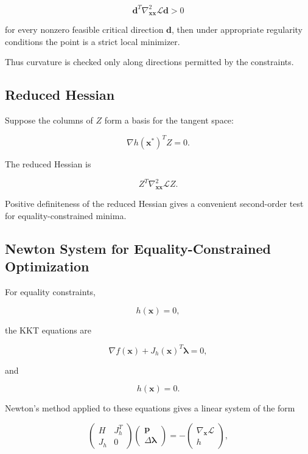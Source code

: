 \[
\boxed{
\mathbf{d}^T
\nabla_{\mathbf{x}\mathbf{x}}^2
\mathcal{L}
\mathbf{d}
>0
}
\]

for every nonzero feasible critical direction \(\mathbf{d}\), then under
appropriate regularity conditions the point is a strict local minimizer.

Thus curvature is checked only along directions permitted by the
constraints.

\subsection{Reduced Hessian}
\label{subsec:reduced-hessian}

Suppose the columns of \(Z\) form a basis for the tangent space:

\[
\boxed{
\nabla h(\mathbf{x}^*)^TZ=0.
}
\]

The reduced Hessian is

\[
\boxed{
Z^T
\nabla_{\mathbf{x}\mathbf{x}}^2
\mathcal{L}
Z.
}
\]

Positive definiteness of the reduced Hessian gives a convenient
second-order test for equality-constrained minima.

\subsection{Newton System for Equality-Constrained Optimization}
\label{subsec:equality-kkt-newton-system}

For equality constraints,

\[
h(\mathbf{x})=0,
\]

the KKT equations are

\[
\boxed{
\nabla f(\mathbf{x})
+
J_h(\mathbf{x})^T\boldsymbol{\lambda}
=
0,
}
\]

and

\[
\boxed{
h(\mathbf{x})=0.
}
\]

Newton's method applied to these equations gives a linear system of the
form

\[
\boxed{
\begin{pmatrix}
H & J_h^T\\
J_h & 0
\end{pmatrix}
\begin{pmatrix}
\mathbf{p}\\
\Delta\boldsymbol{\lambda}
\end{pmatrix}
=
-
\begin{pmatrix}
\nabla_{\mathbf{x}}\mathcal{L}\\
h
\end{pmatrix},
}
\]

